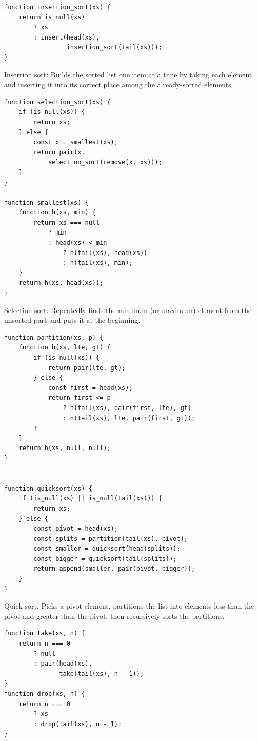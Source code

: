 \documentclass[10pt, landscape]{article}
\begin{document}
\begin{multicols}{4}
\begin{verbatim}
function insertion_sort(xs) {
    return is_null(xs)
        ? xs
        : insert(head(xs),
                 insertion_sort(tail(xs)));
}
\end{verbatim}
Insertion sort: Builds the sorted list one item at a time by taking each element and inserting it into its correct place among the already-sorted elements.

\begin{verbatim}
function selection_sort(xs) {
    if (is_null(xs)) {
        return xs;
    } else {
        const x = smallest(xs);
        return pair(x,
            selection_sort(remove(x, xs)));
    }
}

function smallest(xs) {
    function h(xs, min) {
        return xs === null
            ? min
            : head(xs) < min
                ? h(tail(xs), head(xs))
                : h(tail(xs), min);
    }
    return h(xs, head(xs));
}
\end{verbatim}
Selection sort: Repeatedly finds the minimum (or maximum) element from the unsorted part and puts it at the beginning.

\begin{verbatim}
function partition(xs, p) {
    function h(xs, lte, gt) {
        if (is_null(xs)) {
            return pair(lte, gt);
        } else {
            const first = head(xs);
            return first <= p
                ? h(tail(xs), pair(first, lte), gt)
                : h(tail(xs), lte, pair(first, gt));
        }
    }
    return h(xs, null, null);
}


function quicksort(xs) {
    if (is_null(xs) || is_null(tail(xs))) {
        return xs;
    } else {
        const pivot = head(xs);
        const splits = partition(tail(xs), pivot);
        const smaller = quicksort(head(splits));
        const bigger = quicksort(tail(splits));
        return append(smaller, pair(pivot, bigger));
    }
}
\end{verbatim}
Quick sort: Picks a pivot element, partitions the list into elements less than the pivot and greater than the pivot, then recursively sorts the partitions.

\begin{verbatim}
function take(xs, n) {
    return n === 0
        ? null
        : pair(head(xs),
               take(tail(xs), n - 1));
}
function drop(xs, n) {
    return n === 0
        ? xs
        : drop(tail(xs), n - 1);
}


\end{verbatim}
\end{multicols}
\end{document}
